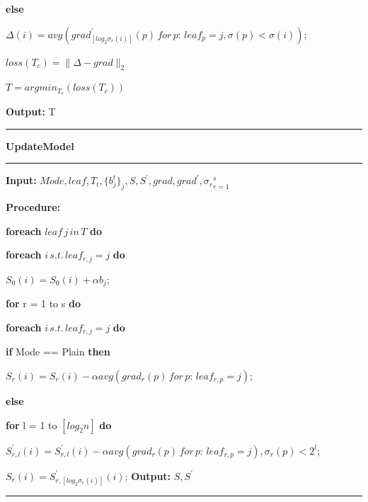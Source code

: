 \documentclass[a4paper]{article}
\begin{document}
\begin{enumerate}
						\hspace*{96pt} \textbf{else}\par
						\hspace*{112pt} $\Delta(i) = avg(grad_{[log_2\sigma_r(i)]}^{'}(p)\, for\, p:\, leaf_p = j, \sigma(p)<\sigma(i))$;\par
						\hspace*{80pt} $loss(T_c) = \|\Delta-grad\|_2$\par
						\hspace*{64pt} $T = argmin_{T_c}(loss(T_c))$\par
				\textbf{Output:} T\\
				\noindent\rule[0.10\baselineskip]{\textwidth}{0.5pt}
				\textbf{UpdateModel}\\
				\noindent\rule[0.10\baselineskip]{\textwidth}{0.5pt}
				\textbf{Input:} $Mode, leaf, T_t, \{b_j^t\}_j, S, S^{'},grad, grad^{'}, {\sigma_r}_{r=1}^{s}$\par
						\textbf{Procedure:}\par
						\hspace*{32pt} \textbf{foreach} $leaf\,j\,in\,T$ \textbf{do}\par
						\hspace*{48pt} \textbf{foreach} $i\,s.t.\,leaf_{r,j}=j$ \textbf{do}\par
						\hspace*{64pt} $S_0(i) = S_0(i) + \alpha b_j$;\par
						\hspace*{48pt} \textbf{for} r = 1 to s \textbf{do}\par
						\hspace*{64pt} \textbf{foreach} $i\,s.t.\,leaf_{r,j}=j$ \textbf{do}\par
						\hspace*{80pt} \textbf{if} Mode == Plain \textbf{then}\par
						\hspace*{96pt} $S_r(i) = S_r(i) - \alpha avg(grad_r(p)\, for\, p:\, leaf_{r,p} = j)$;\par
						\hspace*{80pt} \textbf{else}\par
						\hspace*{96pt} \textbf{for} l = 1 to $[log_2n]$ \textbf{do}\par
						\hspace*{112pt} $S_{r,l}^{'}(i) = S_{r,l}^{'}(i) - \alpha avg(grad_r(p)\, for\, p:\, leaf_{r,p} = j), \sigma_r(p)<2^l$;\par
						\hspace*{96pt} $S_r(i) = S_{r, [log_2\sigma_r(i)]}^{'}(i)$;
				\textbf{Output:} $S, S^{'}$\\
				\noindent\rule[0.10\baselineskip]{\textwidth}{0.75pt}


\end{enumerate}
\end{document}
